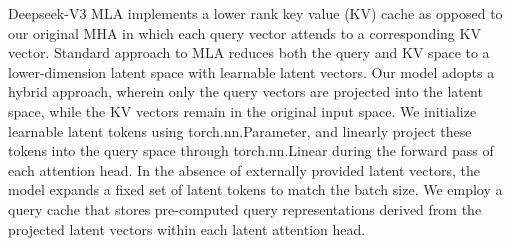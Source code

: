 Deepseek-V3 MLA implements a lower rank key value (KV) cache as opposed to our original MHA in which each query vector attends to a corresponding KV vector\cite{liu2024deepseekv2}. Standard approach to MLA reduces both the query and KV space to a lower-dimension latent space with learnable latent vectors\cite{liu2024deepseekv2}. Our model adopts a hybrid approach, wherein only the query vectors are projected into the latent space, while the KV vectors remain in the original input space. We initialize learnable latent tokens using torch.nn.Parameter, and linearly project these tokens into the query space through torch.nn.Linear during the forward pass of each attention head. In the absence of externally provided latent vectors, the model expands a fixed set of latent tokens to match the batch size. We employ a query cache that stores pre-computed query representations derived from the projected latent vectors within each latent attention head.